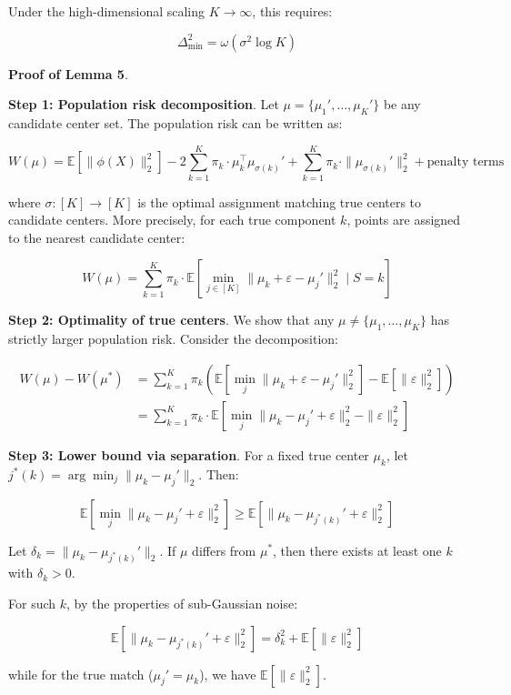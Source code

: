 \documentclass[
  12pt,
]{article}
\begin{document}
Under the high-dimensional scaling \(K \to \infty\), this requires:

\[\Delta_{\min}^2 = \omega(\sigma^2 \log K)\]

\textbf{Proof of Lemma 5}.

\textbf{Step 1: Population risk decomposition}. Let
\(\mu = \{\mu_1',\dots,\mu_K'\}\) be any candidate center set. The
population risk can be written as:

\[W(\mu) = \mathbb{E}\left[\|\phi(X)\|_2^2\right] - 2\sum_{k=1}^K \pi_k \cdot \mu_k^\top \mu_{\sigma(k)}' + \sum_{k=1}^K \pi_k \cdot \|\mu_{\sigma(k)}'\|_2^2 + \text{penalty terms}\]

where \(\sigma: [K] \to [K]\) is the optimal assignment matching true
centers to candidate centers. More precisely, for each true component
\(k\), points are assigned to the nearest candidate center:

\[W(\mu) = \sum_{k=1}^K \pi_k \cdot \mathbb{E}\left[\min_{j \in [K]} \|\mu_k + \varepsilon - \mu_j'\|_2^2 \mid S = k\right]\]

\textbf{Step 2: Optimality of true centers}. We show that any
\(\mu \neq \{\mu_1,\dots,\mu_K\}\) has strictly larger population risk.
Consider the decomposition:

\[\begin{aligned}
W(\mu) - W(\mu^*)
&= \sum_{k=1}^K \pi_k \left( \mathbb{E}\left[\min_j \|\mu_k + \varepsilon - \mu_j'\|_2^2\right] - \mathbb{E}\left[\|\varepsilon\|_2^2\right] \right) \\
&= \sum_{k=1}^K \pi_k \cdot \mathbb{E}\left[ \min_j \|\mu_k - \mu_j' + \varepsilon\|_2^2 - \|\varepsilon\|_2^2 \right]
\end{aligned}\]

\textbf{Step 3: Lower bound via separation}. For a fixed true center
\(\mu_k\), let \(j^*(k) = \arg\min_j \|\mu_k - \mu_j'\|_2\). Then:

\[\mathbb{E}\left[ \min_j \|\mu_k - \mu_j' + \varepsilon\|_2^2 \right] \geq \mathbb{E}\left[ \|\mu_k - \mu_{j^*(k)}' + \varepsilon\|_2^2 \right]\]

Let \(\delta_k = \|\mu_k - \mu_{j^*(k)}'\|_2\). If \(\mu\) differs from
\(\mu^*\), then there exists at least one \(k\) with \(\delta_k > 0\).

For such \(k\), by the properties of sub-Gaussian noise:

\[\mathbb{E}\left[ \|\mu_k - \mu_{j^*(k)}' + \varepsilon\|_2^2 \right] = \delta_k^2 + \mathbb{E}[\|\varepsilon\|_2^2]\]

while for the true match (\(\mu_j' = \mu_k\)), we have
\(\mathbb{E}[\|\varepsilon\|_2^2]\).
\end{document}
